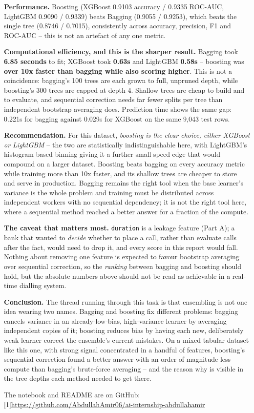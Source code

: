 \documentclass[11pt,a4paper]{article}
\begin{document}
\textbf{Performance.} Boosting (XGBoost 0.9103 accuracy / 0.9335 ROC-AUC, LightGBM 0.9090
/ 0.9339) beats Bagging (0.9055 / 0.9253), which beats the single tree (0.8746 / 0.7015),
consistently across accuracy, precision, F1 and ROC-AUC -- this is not an artefact of any
one metric.

\textbf{Computational efficiency, and this is the sharper result.} Bagging took
\textbf{6.85 seconds} to fit; XGBoost took \textbf{0.63s} and LightGBM \textbf{0.58s} --
boosting was \textbf{over 10x faster than bagging while also scoring higher}. This is not
a coincidence: bagging's 100 trees are each grown to full, unpruned depth, while
boosting's 300 trees are capped at depth 4. Shallow trees are cheap to build and to
evaluate, and sequential correction needs far fewer splits per tree than independent
bootstrap averaging does. Prediction time shows the same gap: 0.221s for bagging against
0.029s for XGBoost on the same 9,043 test rows.

\textbf{Recommendation.} For this dataset, \emph{boosting is the clear choice, either
XGBoost or LightGBM} -- the two are statistically indistinguishable here, with
LightGBM's histogram-based binning giving it a further small speed edge that would
compound on a larger dataset. Boosting beats bagging on every accuracy metric while
training more than 10x faster, and its shallow trees are cheaper to store and serve in
production. Bagging remains the right tool when the base learner's variance is the
whole problem and training must be distributed across independent workers with no
sequential dependency; it is not the right tool here, where a sequential method reached
a better answer for a fraction of the compute.

\textbf{The caveat that matters most.} \texttt{duration} is a leakage feature (Part A); a
bank that wanted to \emph{decide} whether to place a call, rather than evaluate calls
after the fact, would need to drop it, and every score in this report would fall.
Nothing about removing one feature is expected to favour bootstrap averaging over
sequential correction, so the \emph{ranking} between bagging and boosting should hold,
but the absolute numbers above should not be read as achievable in a real-time dialling
system.

\textbf{Conclusion.} The thread running through this task is that ensembling is not one
idea wearing two names. Bagging and boosting fix different problems: bagging cancels
variance in an already-low-bias, high-variance learner by averaging independent copies of
it; boosting reduces bias by having each new, deliberately weak learner correct the
ensemble's current mistakes. On a mixed tabular dataset like this one, with strong
signal concentrated in a handful of features, boosting's sequential correction found a
better answer with an order of magnitude less compute than bagging's brute-force
averaging -- and the reason why is visible in the tree depths each method needed to get
there.

\vspace{0.4cm}
\noindent The notebook and README are on GitHub: {\small\scalebox{0.72}[1]{\url{https://github.com/AbdullahAmir06/ai-internship-abdullahamir}}}
\end{document}
